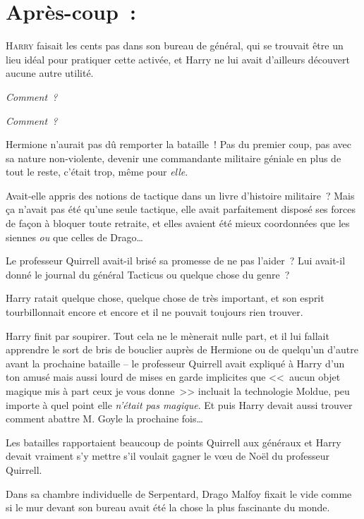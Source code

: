 
\section{Après-coup~:}

\lettrine{H}{arry} faisait les cents pas dans son bureau de général, qui se trouvait être un lieu idéal pour pratiquer cette activée, et Harry ne lui avait d'ailleurs découvert aucune autre utilité.

\emph{Comment~?}

\emph{Comment~?}

Hermione n'aurait pas dû remporter la bataille~! Pas du premier coup, pas avec sa nature non-violente, devenir une commandante militaire géniale en plus de tout le reste, c'était trop, même pour \emph{elle}.

Avait-elle appris des notions de tactique dans un livre d'histoire militaire~? Mais ça n'avait pas été qu'une seule tactique, elle avait parfaitement disposé ses forces de façon à bloquer toute retraite, et elles avaient été mieux coordonnées que les siennes \emph{ou} que celles de Drago…

Le professeur Quirrell avait-il brisé sa promesse de ne pas l'aider~? Lui avait-il donné le journal du général Tacticus ou quelque chose du genre~?

Harry ratait quelque chose, quelque chose de très important, et son esprit tourbillonnait encore et encore et il ne pouvait toujours rien trouver.

Harry finit par soupirer. Tout cela ne le mènerait nulle part, et il lui fallait apprendre le sort de bris de bouclier auprès de Hermione ou de quelqu'un d'autre avant la prochaine bataille -- le professeur Quirrell avait expliqué à Harry d'un ton amusé mais aussi lourd de mises en garde implicites que <<~aucun objet magique mis à part ceux je vous donne~>> incluait la technologie Moldue, peu importe à quel point elle \emph{n'était pas magique}. Et puis Harry devait aussi trouver comment abattre M. Goyle la prochaine fois…

Les batailles rapportaient beaucoup de points Quirrell aux généraux et Harry devait vraiment s'y mettre s'il voulait gagner le vœu de Noël du professeur Quirrell.

\later

Dans sa chambre individuelle de Serpentard, Drago Malfoy fixait le vide comme si le mur devant son bureau avait été la chose la plus fascinante du monde.

